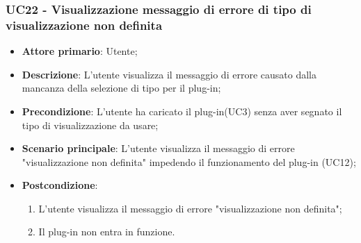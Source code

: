 \subsubsection{UC22 - Visualizzazione messaggio di errore di tipo di visualizzazione non definita}
\label{sssec:uc22}
\begin{itemize}
  \item \textbf{Attore primario}: Utente;
  \item \textbf{Descrizione}: L'utente visualizza il messaggio di errore causato dalla mancanza della selezione di tipo per il plug-in;
  \item \textbf{Precondizione}: L'utente ha caricato il plug-in(UC3) senza aver segnato il tipo di visualizzazione da usare;
  \item \textbf{Scenario principale}: L'utente visualizza il messaggio di errore "visualizzazione non definita" impedendo il funzionamento del plug-in (UC12);
  \item \textbf{Postcondizione}:
  \begin{enumerate}
		\item L'utente visualizza il messaggio di errore "visualizzazione non definita";
		\item Il plug-in non entra in funzione.
	\end{enumerate}
\end{itemize}
